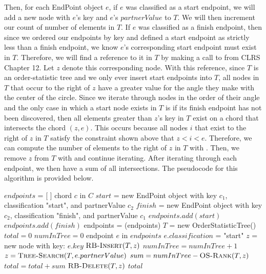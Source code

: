 \documentclass[11pt]{article}
\begin{document}
Then, for each EndPoint object $e$, if $e$ was classified as a start endpoint, we will add a new node with $e$'s key and $e$'s $partnerValue$ to $T$. We will then increment our count of number of elements in $T$. If $e$ was classified as a finish endpoint, then since we ordered our endpoints by key and defined a start endpoint as strictly less than a finish endpoint, we know $e$'s corresponding start endpoint must exist in $T$. Therefore, we will find a reference to it in $T$ by making a call to  from CLRS Chapter 12. Let $z$ denote this corresponding node. With this reference, since $T$ is an order-statistic tree and we only ever insert start endpoints into $T$, all nodes in $T$ that occur to the right of $z$ have a greater value for the angle they make with the center of the circle. Since we iterate through nodes in the order of their angle and the only case in which a start node exists in $T$ is if its finish endpoint has not been discovered, then all elements greater than $z$'s key in $T$ exist on a chord that intersects the chord $(z,e)$. This occurs because all nodes $i$ that exist to the right of $z$ in $T$ satisfy the constraint shown above that $z < i < e$. Therefore, we can compute the number of elements to the right of $z$ in $T$ with . Then, we remove $z$ from $T$ with  and continue iterating. After iterating through each endpoint, we then have a sum of all intersections. The pseudocode for this algorithm is provided below.

\begin{codebox}
\li $endpoints$ = [ ]
\li \For chord $c$ in $C$ \Do
\li     $start$ = new EndPoint object with key $c_1$, classification "start", and partnerValue $c_2$
\li     $finish$ = new EndPoint object with key $c_2$, classification "finish", and partnerValue $c_1$
\li     $endpoints.add(start)$
\li     $endpoints.add(finish)$
\li \End
\li endpoints = (endpoints)
\li $T$ = new OrderStatisticTree()
\li $total = 0$
\li $numInTree = 0$
\li \For endpoint $e$ in $endpoints$ \Do
\li     \If $e.classification$ = "start" \Then
\li         $z$ = new node with key: $e.key$
\li         $\textnormal{\scshape RB-Insert}(T,z)$
\li         $numInTree = numInTree + 1$
\li     \Else
\li         $z = \textnormal{\scshape Tree-Search}(T, e.partnerValue)$
\li         $sum = numInTree - \textnormal{\scshape OS-Rank}(T,z)$
\li         $total = total + sum$
\li         $\textnormal{\scshape RB-Delete}(T,z)$
        \End
\li \End
\li \Return $total$
\end{codebox}
\end{document}

